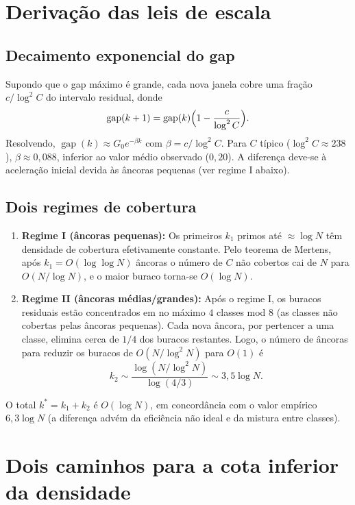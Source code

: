 \documentclass[11pt]{article}
\theoremstyle{definition}
\begin{document}
	\section{Derivação das leis de escala}
	
	\subsection{Decaimento exponencial do gap}
	Supondo que o gap máximo é grande, cada nova janela cobre uma fração $c/\log^2 C$ do intervalo residual, donde
	\[
	\operatorname{gap}(k+1) = \operatorname{gap}(k)\Bigl(1-\frac{c}{\log^2 C}\Bigr).
	\]
	Resolvendo, $\operatorname{gap}(k)\approx G_0 e^{-\beta k}$ com $\beta = c/\log^2 C$. Para $C$ típico ($\log^2 C\approx238$), $\beta\approx0{,}088$, inferior ao valor médio observado ($0{,}20$). A diferença deve-se à aceleração inicial devida às âncoras pequenas (ver regime I abaixo).
	
	\subsection{Dois regimes de cobertura}
	\label{sec:doisregimes}
	\begin{enumerate}
		\item \textbf{Regime I (âncoras pequenas):} Os primeiros $k_1$ primos até $\approx\log N$ têm densidade de cobertura efetivamente constante. Pelo teorema de Mertens, após $k_1=O(\log\log N)$ âncoras o número de $C$ não cobertos cai de $N$ para $O(N/\log N)$, e o maior buraco torna-se $O(\log N)$.
		\item \textbf{Regime II (âncoras médias/grandes):} Após o regime I, os buracos residuais estão concentrados em no máximo $4$ classes mod $8$ (as classes não cobertas pelas âncoras pequenas). Cada nova âncora, por pertencer a uma classe, elimina cerca de $1/4$ dos buracos restantes. Logo, o número de âncoras para reduzir os buracos de $O(N/\log^2 N)$ para $O(1)$ é
		\[
		k_2 \sim \frac{\log(N/\log^2 N)}{\log(4/3)} \sim 3{,}5\log N.
		\]
	\end{enumerate}
	O total $k^*=k_1+k_2$ é $O(\log N)$, em concordância com o valor empírico $6{,}3\log N$ (a diferença advém da eficiência não ideal e da mistura entre classes).
	
	\section{Dois caminhos para a cota inferior da densidade}
	
\end{document}
